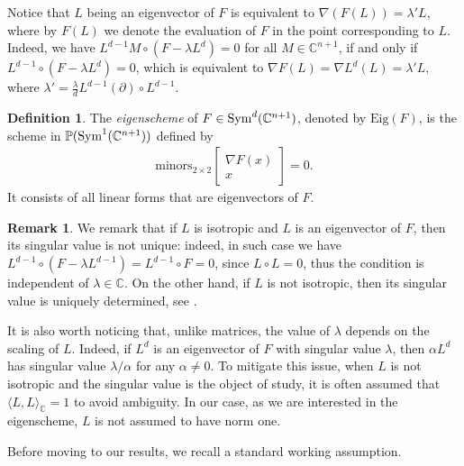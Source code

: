 \documentclass{amsart}
\numberwithin{theorem}{section}
\theoremstyle{definition}
\newtheorem{definition}[theorem]{Definition}
\newtheorem{remark}[theorem]{Remark}
\newcommand{\PP}{\mathbb{P}}
\newcommand{\CC}{\mathbb{C}}
\newcommand{\sym}{\mathop{\rm Sym}\nolimits}
\begin{document}
Notice that $L$ being an eigenvector of $F$ is equivalent to $\nabla(F(L))=\lambda' L$, where by $F(L)$ we denote the evaluation of $F$ in the point corresponding to $L$. Indeed, we have $
 L^{d-1}M\circ(F-\lambda L^d)=0
$ for all $M\in \CC^{n+1}$, if and only if $ L^{d-1}\circ(F-\lambda L^d)=0$, which is equivalent to $\nabla F(L)=\nabla L^d(L)=\lambda' L$, where $\lambda'=\frac{\lambda}{d} L^{d-1}(\partial)\circ L^{d-1}.$


\begin{definition}\label{def:eigenscheme}
    The \emph{eigenscheme} of $F\in \sym^d(\CC^{n+1})$, denoted by $\mathrm{Eig}(F)$, is the scheme in $\PP(\sym^1(\CC^{n+1}))$ defined by 
    \begin{align}\label{eq: defining ideal eigenscheme}
    \mathrm{minors}_{2\times2}\begin{bmatrix}
        \nabla F(x)\\
    x
    \end{bmatrix}=0.
    \end{align}
    It consists of all linear forms that are eigenvectors of $F$.
\end{definition}

\begin{remark}
We remark that if $L$ is isotropic and $L$ is an eigenvector of $F$, then its singular value is not unique: indeed, in such case we have $L^{d-1}\circ (F-\lambda L^{d-1})= L^{d-1}\circ F=0$, since $L\circ L=0$, thus the condition is independent of $\lambda\in\CC$. On the other hand, if $L$ is not isotropic, then its singular value is uniquely determined, see \cite[Proposition 2.6]{DOT18}.  
\end{remark}

It is also  worth noticing that, unlike matrices, the value of $\lambda$ depends on the scaling of $L$. Indeed, if $L^d$ is an eigenvector of $F$ with singular value $\lambda$, then $\alpha L^d$ has singular value $\lambda / \alpha$ {for any $\alpha\neq0$}.  To mitigate this issue, when $L$ is not isotropic and the singular value is the object of study, it is often assumed that $\langle L,L\rangle_\CC=1$ to avoid ambiguity. In our case, as we are interested in the eigenscheme, $L$ is not assumed to have norm one.

\medskip
Before moving to our results, we recall a standard working assumption.
\end{document}

